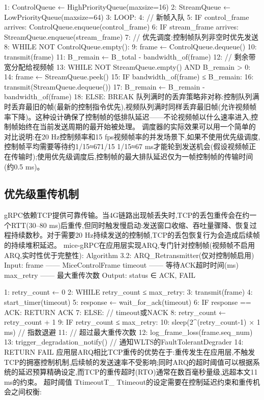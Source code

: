 1:  ControlQueue ← HighPriorityQueue(maxsize=16)
2:  StreamQueue  ← LowPriorityQueue(maxsize=64)
3:  LOOP:
4:    // 新帧入队
5:    IF control_frame arrives: ControlQueue.enqueue(control_frame)
6:    IF stream_frame  arrives: StreamQueue.enqueue(stream_frame)
7:    // 优先调度:控制帧队列非空时优先发送
8:    WHILE NOT ControlQueue.empty():
9:        frame ← ControlQueue.dequeue()
10:       transmit(frame)
11:       B_remain ← B_total - bandwidth_of(frame)
12:   // 剩余带宽分配给视频帧
13:   WHILE NOT StreamQueue.empty() AND B_remain > 0:
14:       frame ← StreamQueue.peek()
15:       IF bandwidth_of(frame) ≤ B_remain:
16:           transmit(StreamQueue.dequeue())
17:           B_remain ← B_remain - bandwidth_of(frame)
18:       ELSE: BREAK
队列满时的丢弃策略非对称:控制队列满时丢弃最旧的帧(最新的控制指令优先),视频队列满时同样丢弃最旧帧(允许视频帧率下降)。这种设计确保了控制帧的低排队延迟——不论视频帧以什么速率进入,控制帧始终在当前发送周期的最开始被处理。
调度器的实际效果可以用一个简单的对比说明:在20 Hz控制频率和15 fps视频帧率的并发场景下,如果不使用优先级调度,控制帧平均需要等待约1/15≈671/15 
1/15≈67 ms才能轮到发送机会(假设视频帧正在传输时);使用优先级调度后,控制帧的最大排队延迟仅为一帧控制帧的传输时间(约0.5 ms)。

\subsection{优先级重传机制}

gRPC依赖TCP提供可靠传输。当4G链路出现帧丢失时,TCP的丢包重传会在约一个RTT(30–80 ms)后重传,但同时触发慢启动:发送窗口收缩、吞吐量骤降、恢复过程持续数秒。对于需要20 Hz持续发送的控制帧,TCP的丢包恢复行为会造成后续帧的持续堆积延迟。
mice-gRPC在应用层实现ARQ,专门针对控制帧(视频帧不启用ARQ,实时性优于完整性):
Algorithm 3.2: ARQ_Retransmitter(仅对控制帧启用)
Input:  frame      —— MiceControlFrame
        timeout    —— 等待ACK超时时间(ms)
        max_retry  —— 最大重传次数
Output: status ∈ {ACK, FAIL}

1:  retry_count ← 0
2:  WHILE retry_count ≤ max_retry:
3:      transmit(frame)
4:      start_timer(timeout)
5:      response ← wait_for_ack(timeout)
6:      IF response == ACK: RETURN ACK
7:      ELSE:  // timeout或NACK
8:          retry_count ← retry_count + 1
9:          IF retry_count ≤ max_retry:
10:             sleep(2^(retry_count-1) × 1 ms)  // 指数退避
11: // 超过最大重传次数
12: log_frame_loss(frame.seq_num)
13: trigger_degradation_notify()  // 通知WLTS的FaultTolerantDegrader
14: RETURN FAIL
应用层ARQ相比TCP重传的优势在于:重传发生在应用层,不触发TCP的拥塞控制机制,后续帧的发送速率不受影响;同时ARQ的超时阈值可以根据系统的延迟预算精确设定,而TCP的重传超时(RTO)通常在数百毫秒量级,远超本文11 ms的约束。
超时阈值 TtimeoutT_{}
Ttimeout的设定需要在控制延迟约束和重传机会之间权衡:

